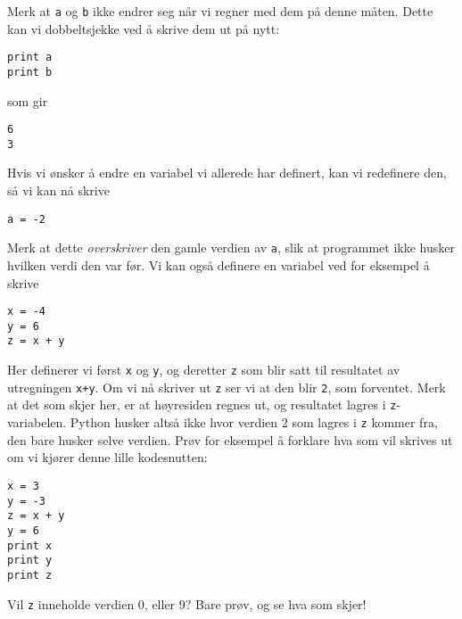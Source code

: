 \documentclass[a4paper, 11pt, notitlepage, english]{article}
\begin{document}
Merk at \verb+a+ og \verb+b+ ikke endrer seg når vi regner med dem på denne måten. Dette kan vi dobbeltsjekke ved å skrive dem ut på nytt:
\begin{lstlisting}
print a
print b
\end{lstlisting}
\vspace{-0.3cm}
som gir
\begin{lstlisting}
6
3
\end{lstlisting}
\vspace{-0.3cm}
Hvis vi ønsker å endre en variabel vi allerede har definert, kan vi redefinere den, så vi kan nå skrive
\begin{lstlisting}
a = -2
\end{lstlisting}
\vspace{-0.3cm}
Merk at dette \emph{overskriver} den gamle verdien av \verb+a+, slik at programmet ikke husker hvilken verdi den var før. Vi kan også definere en variabel ved for eksempel å skrive
\begin{lstlisting}
x = -4
y = 6
z = x + y
\end{lstlisting}
\vspace{-0.3cm}
Her definerer vi først \verb+x+ og \verb+y+, og deretter \verb+z+ som blir satt til resultatet av utregningen \verb!x+y!. Om vi nå skriver ut \verb+z+ ser vi at den blir \verb+2+, som forventet. Merk at det som skjer her, er at høyresiden regnes ut, og resultatet lagres i \verb+z+-variabelen. Python husker altså ikke hvor verdien $2$ som lagres i \verb+z+ kommer fra, den bare husker selve verdien. Prøv for eksempel å forklare hva som vil skrives ut om vi kjører denne lille kodesnutten:
\begin{lstlisting}
x = 3
y = -3
z = x + y
y = 6
print x 
print y 
print z
\end{lstlisting}
\vspace{-0.3cm}
Vil \verb+z+ inneholde verdien 0, eller 9? Bare prøv, og se hva som skjer!
\end{document}
